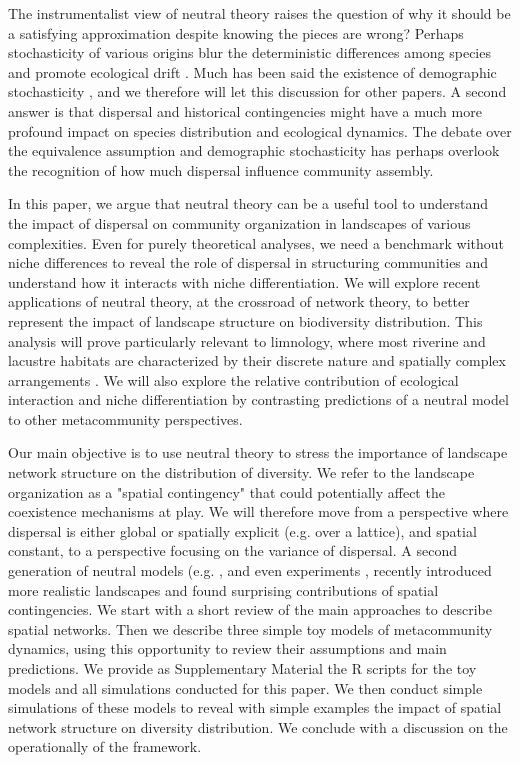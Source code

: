 \documentclass[12pt]{article}
\begin{document}
The instrumentalist view of neutral theory raises the question of why it should
be a satisfying approximation despite knowing the pieces are wrong? Perhaps
stochasticity of various origins blur the deterministic differences among
species and promote ecological drift \parencite{Gravel2011a}. Much has been said
the existence of demographic stochasticity \parencite{Clark2012}, and we
therefore will let this discussion for other papers. A second answer is that
dispersal and historical contingencies might have a much more profound impact on
species distribution \parencite{Bahn2007, Boulangeat2012} and ecological
dynamics. The debate over the equivalence assumption and demographic
stochasticity has perhaps overlook the recognition of how much dispersal
influence community assembly.

In this paper, we argue that neutral theory can be a useful tool to understand
the impact of dispersal on community organization in landscapes of various
complexities. Even for purely theoretical analyses, we need a benchmark without
niche differences to reveal the role of dispersal in structuring communities and
understand how it interacts with niche differentiation. We will explore recent
applications of neutral theory, at the crossroad of network theory, to better
represent the impact of landscape structure on biodiversity distribution. This
analysis will prove particularly relevant to limnology, where most riverine and
lacustre habitats are characterized by their discrete nature and spatially
complex arrangements \parencite{Peterson2013}. We will also explore the relative
contribution of ecological interaction and niche differentiation by contrasting
predictions of a neutral model to other metacommunity perspectives.

Our main objective is to use neutral theory to stress the importance of
landscape network structure on the distribution of diversity. We refer to the
landscape organization as a "spatial contingency" \parencite{Peres-Neto2013}
that could potentially affect the coexistence mechanisms at play. We will
therefore move from a perspective where dispersal is either global or spatially
explicit (e.g. over a lattice), and spatial constant, to a perspective focusing
on the variance of dispersal. A second generation of neutral models (e.g.
\textcite{Economo2008, Economo2011,Desjardins2012a,Desjardins2012b}, and even
experiments \parencite{Altermat2012}, recently introduced more realistic
landscapes and found surprising contributions of spatial contingencies. We start
with a short review of the main approaches to describe spatial networks. Then we
describe three simple toy models of metacommunity dynamics, using this
opportunity to review their assumptions and main predictions. We provide as
Supplementary Material the R scripts for the toy models and all simulations
conducted for this paper. We then conduct simple simulations of these models to
reveal with simple examples the impact of spatial network structure on diversity
distribution. We conclude with a discussion on the operationally of the
framework.
\end{document}

